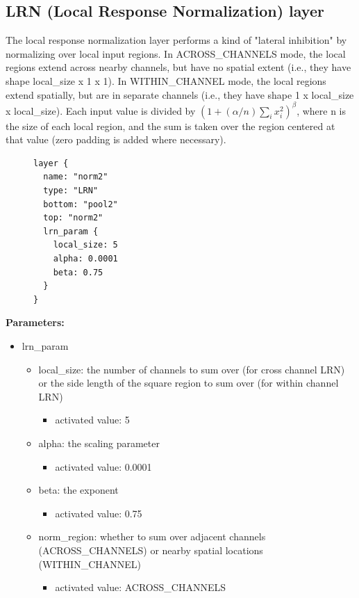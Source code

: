 \documentclass[11pt]{article}
\begin{document}
\subsection{LRN (Local Response Normalization) layer}
The local response normalization layer performs a kind of "lateral inhibition" by normalizing over local input regions. In ACROSS\_CHANNELS mode, the local regions extend across nearby channels, but have no spatial extent (i.e., they have shape local\_size x 1 x 1). In WITHIN\_CHANNEL mode, the local regions extend spatially, but are in separate channels (i.e., they have shape 1 x local\_size x local\_size). Each input value is divided by $(1 + (\alpha/n) \sum\nolimits_{i}x^2_{i})^\beta$, where n is the size of each local region, and the sum is taken over the region centered at that value (zero padding is added where necessary).

\begin{figure}
  \begin{center}
	\begin{verbatim}
layer {
  name: "norm2"
  type: "LRN"
  bottom: "pool2"
  top: "norm2"
  lrn_param {
    local_size: 5
    alpha: 0.0001
    beta: 0.75
  }
}
	\end{verbatim}
  \end{center}
\end{figure}
\textbf{Parameters:}
\begin{itemize}
	\item lrn\_param
	\begin{itemize}
		\item local\_size:  the number of channels to sum over (for cross channel LRN) or the side length of the square region to sum over (for within channel LRN)
		\begin{itemize}
			\item activated value: 5
		\end{itemize}
		\item alpha: the scaling parameter
		\begin{itemize}
			\item activated value: 0.0001
		\end{itemize}
		\item beta: the exponent
		\begin{itemize}
			\item activated value: 0.75
		\end{itemize}
		\item norm\_region: whether to sum over adjacent channels (ACROSS\_CHANNELS) or nearby spatial locations (WITHIN\_CHANNEL)
		\begin{itemize}
			\item activated value: ACROSS\_CHANNELS
		\end{itemize}
	\end{itemize}
\end{itemize}
\newpage
\end{document}
